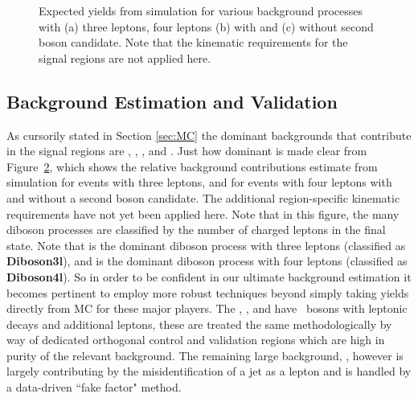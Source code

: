 \begin{figure}[htb]
\begin{subfigure}[b]{0.49\textwidth}
      \caption{}
      \label{fig:pie_c}
    \end{subfigure}
    \caption{
    Expected yields from simulation for various background processes with (a) three leptons, four leptons (b) with and (c) without second boson candidate.
    Note that the kinematic requirements for the signal regions are not applied here.}
    \label{fig:PieYields}
\end{figure}

\subsection{Background Estimation and Validation}
As cursorily stated in Section \ref{sec:MC} the dominant backgrounds that contribute in the signal regions are \WZ, \ZZ, \ttZ, and \Zjets. 
Just how dominant is made clear from Figure~\ref{fig:PieYields}, which shows the relative background contributions estimate from simulation for events with three leptons, and for events with four leptons with and without a second boson candidate.
The additional region-specific kinematic requirements have not yet been applied here.
Note that in this figure, the many diboson processes are classified by the number of charged leptons in the final state.
Note that \WZ is the dominant diboson process with three leptons (classified as \small{\bf{Diboson3l}}), and \ZZ is the dominant diboson process with four leptons (classified as \small{\bf{Diboson4l}}). 
So in order to be confident in our ultimate background estimation it becomes pertinent to employ more robust techniques beyond simply taking yields directly from MC for these major players.
The \WZ, \ZZ, and \ttZ  have \Zboson\ bosons with leptonic decays and additional leptons, these are treated the same methodologically by way of dedicated orthogonal control and validation regions which are high in purity of the relevant background. 
The remaining large background, \Zjets, however is largely contributing by the misidentification of a jet as a lepton and is handled by a data-driven ``fake factor" method.
